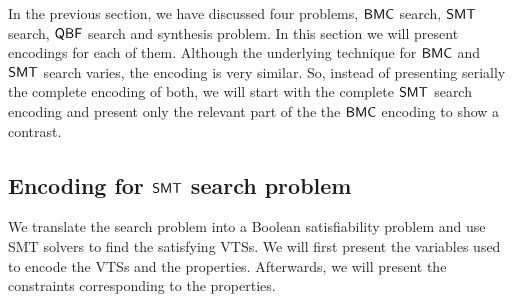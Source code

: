 %
%
%
\noindent In the previous section, we have discussed four problems, $\mathsf{BMC}$ search, $\mathsf{SMT}$ search, $\mathsf{QBF}$ search and synthesis problem.
%
In this section we will present encodings for each of them.
%
Although the underlying technique for $\mathsf{BMC}$ and $\mathsf{SMT}$ search varies, the encoding is very similar. 
%
So, instead of presenting serially the complete encoding of both, 
%
we will start with the complete $\mathsf{SMT}$ search encoding and present only the relevant part of the the $\mathsf{BMC}$ encoding to show a contrast.

\subsection{Encoding for $\mathsf{SMT}$ search problem}
\label{enc:smt}

\noindent We translate the search problem into a Boolean satisfiability
problem and use SMT solvers to find the satisfying VTSs.
%
We will first present the variables used to encode the
VTSs and the properties.
%
Afterwards, we will present the constraints corresponding to the
properties.

